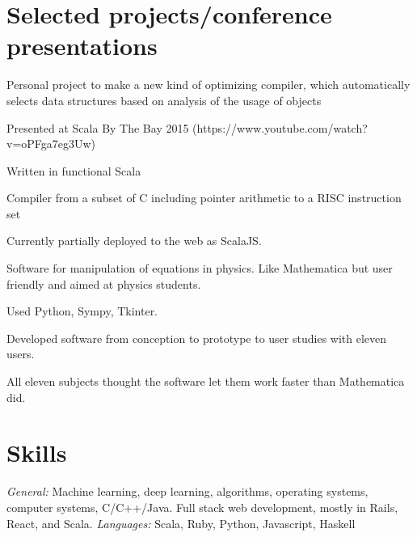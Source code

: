 \documentclass[letterpaper]{resume}
\begin{document}
\section{Selected projects/conference presentations}

\begin{compactitem}
\item Personal project to make a new kind of optimizing compiler, which automatically selects data structures based on analysis of the usage of objects
\item Presented at Scala By The Bay 2015 (https://www.youtube.com/watch?v=oPFga7eg3Uw)
\item Written in functional Scala
\end{compactitem}

\begin{compactitem}
\item Compiler from a subset of C including pointer arithmetic to a RISC instruction set
\item Currently partially deployed to the web as ScalaJS.
\end{compactitem}

\begin{compactitem}
\item Software for manipulation of equations in physics. Like Mathematica but user friendly and aimed at physics students.
\item Used Python, Sympy, Tkinter.
\item Developed software from conception to prototype to user studies with eleven users.
\item All eleven subjects thought the software let them work faster than Mathematica did.
\end{compactitem}


\section{Skills}
\textit{General:} Machine learning, deep learning, algorithms, operating systems, computer systems, C/C++/Java. Full stack web development, mostly in Rails, React, and Scala.
\textit{Languages:} Scala, Ruby, Python, Javascript, Haskell\\
\end{document}
